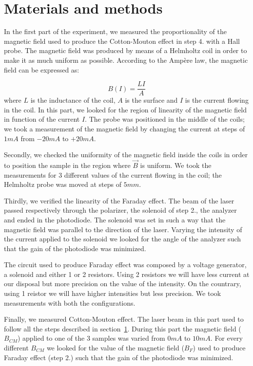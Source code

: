 \documentclass[11pt,a4paper]{article}
\begin{document}
\section{Materials and methods}\label{mm}
In the first part of the experiment, we measured the proportionality of the magnetic field used to produce the Cotton-Mouton effect in step 4. with a Hall probe. The magnetic field was produced by means of a Helmholtz coil in order to make it as much uniform as possible. According to the Ampère law, the magnetic field can be expressed as:

\begin{equation}
B(I)=\frac{LI}{A}
\end{equation}
where $L$ is the inductance of the coil, $A$ is the surface and $I$ is the current flowing in the coil. In this part, we looked for the region of linearity of the magnetic field in function of the current $I$. The probe was positioned in the middle of the coils; we took a measurement of the magnetic field by changing the current at steps of $1mA$ from $-20mA$ to $+20mA$.

Secondly, we checked the uniformity of the magnetic field inside the coils in order to position the sample in the region where $\vec{B}$ is uniform. We took the measurements for 3 different values of the current flowing in the coil; the Helmholtz probe was moved at steps of $5mm$.

Thirdly, we verified the linearity of the Faraday effect. The beam of the laser passed respectively through the polarizer, the solenoid of step 2., the analyzer and ended in the photodiode. The solenoid was set in such a way that the magnetic field was parallel to the direction of the laser. Varying the intensity of the current applied to the solenoid we looked for the angle of the analyzer such that the gain of the photodiode was minimized.

The circuit used to produce Faraday effect was composed by a voltage generator, a solenoid and either 1 or 2 resistors. Using 2 resistors we will have less current at our disposal but more precision on the value of the intensity. On the countrary, using 1 reistor we will have higher intensities but less precision. We took measurements with both the configurations.

Finally, we measured Cotton-Mouton effect. The laser beam in this part used to follow all the steps described in section~\ref{mm}. During this part the magnetic field ($B_{CM}$) applied to one of the 3 samples was varied from $0mA$ to $10mA$. For every different $B_{CM}$ we looked for the value of the magnetic field ($B_F$) used to produce Faraday effect (step 2.) such that the gain of the photodiode was minimized.
\end{document}
